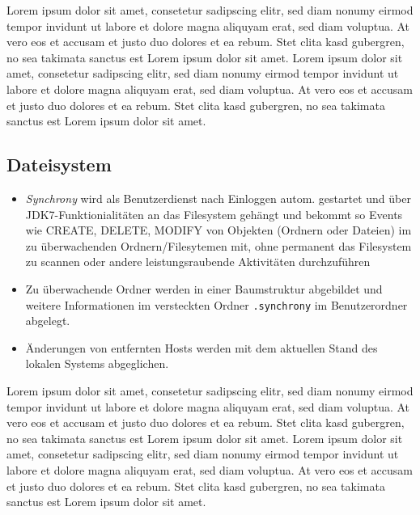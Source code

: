 \documentclass[12pt,oneside,a4paper,bibtotoc,liststotoc,pointlessnumbers]{scrartcl}
\begin{document}
\vspace{12px}
Lorem ipsum dolor sit amet, consetetur sadipscing elitr, sed diam nonumy eirmod tempor invidunt ut labore et dolore magna aliquyam erat, sed diam voluptua. At vero eos et accusam et justo duo dolores et ea rebum. Stet clita kasd gubergren, no sea takimata sanctus est Lorem ipsum dolor sit amet. Lorem ipsum dolor sit amet, consetetur sadipscing elitr, sed diam nonumy eirmod tempor invidunt ut labore et dolore magna aliquyam erat, sed diam voluptua. At vero eos et accusam et justo duo dolores et ea rebum. Stet clita kasd gubergren, no sea takimata sanctus est Lorem ipsum dolor sit amet.
\subsection{Dateisystem}
\begin{itemize}
\item \textit{Synchrony} wird als Benutzerdienst nach Einloggen autom. gestartet und über JDK7-Funktionialitäten an das Filesystem gehängt und bekommt so Events wie CREATE, DELETE, MODIFY von Objekten (Ordnern oder Dateien) im zu überwachenden Ordnern/Filesytemen mit, ohne permanent das Filesystem zu scannen oder andere leistungsraubende Aktivitäten durchzuführen
\item Zu überwachende Ordner werden in einer Baumstruktur abgebildet und weitere Informationen im versteckten Ordner \texttt{.synchrony} im Benutzerordner abgelegt.
\item Änderungen von entfernten Hosts werden mit dem aktuellen Stand des lokalen Systems abgeglichen.
\end{itemize}
\vspace{12px}
Lorem ipsum dolor sit amet, consetetur sadipscing elitr, sed diam nonumy eirmod tempor invidunt ut labore et dolore magna aliquyam erat, sed diam voluptua. At vero eos et accusam et justo duo dolores et ea rebum. Stet clita kasd gubergren, no sea takimata sanctus est Lorem ipsum dolor sit amet. Lorem ipsum dolor sit amet, consetetur sadipscing elitr, sed diam nonumy eirmod tempor invidunt ut labore et dolore magna aliquyam erat, sed diam voluptua. At vero eos et accusam et justo duo dolores et ea rebum. Stet clita kasd gubergren, no sea takimata sanctus est Lorem ipsum dolor sit amet.
\end{document}
